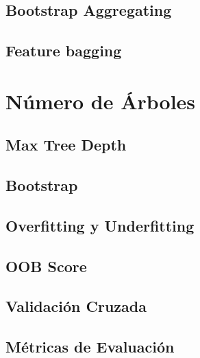 		\subsection{Bootstrap Aggregating}
		\subsection{Feature bagging}
	\section{Número de Árboles}
		\subsection{Max Tree Depth}
		\subsection{Bootstrap}
		\subsection{Overfitting y Underfitting}
		\subsection{OOB Score}
		\subsection{Validación Cruzada}
		\subsection{Métricas de Evaluación}
		
			
		